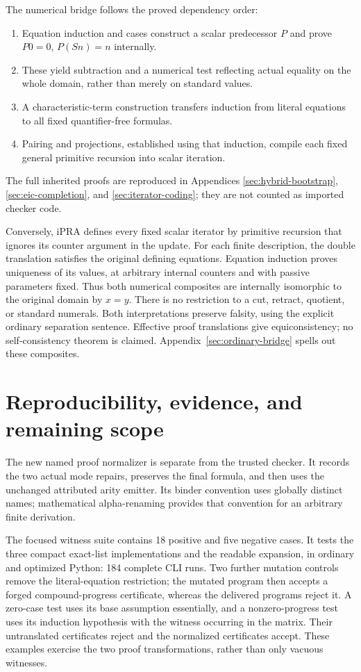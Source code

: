 \documentclass[11pt,letterpaper]{article}
\theoremstyle{definition}\newtheorem{definition}[theorem]{Definition}
\theoremstyle{remark}\newtheorem{remark}[theorem]{Remark}
\begin{document}
The numerical bridge follows the proved dependency order:
\begin{enumerate}
\item Equation induction and cases construct a scalar predecessor
      $P$ and prove $P0=0$, $P(Sn)=n$ internally.
\item These yield subtraction and a numerical test reflecting actual
      equality on the whole domain, rather than merely on standard values.
\item A characteristic-term construction transfers induction from
      literal equations to all fixed quantifier-free formulas.
\item Pairing and projections, established using that induction,
      compile each fixed general primitive recursion into scalar iteration.
\end{enumerate}
The full inherited proofs are reproduced in Appendices
\ref{sec:hybrid-bootstrap}, \ref{sec:eic-completion}, and
\ref{sec:iterator-coding}; they are not counted as imported checker code.

Conversely, iPRA defines every fixed scalar iterator by primitive recursion
that ignores its counter argument in the update. For each finite description,
the double translation satisfies the original defining equations.
Equation induction proves uniqueness of its values, at arbitrary internal
counters and with passive parameters fixed. Thus both numerical composites
are internally isomorphic to the original domain by $x=y$.
There is no restriction to a cut, retract, quotient, or standard numerals.
Both interpretations preserve falsity, using the explicit ordinary
separation sentence. Effective proof translations give equiconsistency;
no self-consistency theorem is claimed. Appendix~\ref{sec:ordinary-bridge}
spells out these composites.

\section{Reproducibility, evidence, and remaining scope}
\label{sec:evidence}

The new named proof normalizer is separate from the trusted checker.
It records the two actual mode repairs, preserves the final formula,
and then uses the unchanged attributed arity emitter. Its binder
convention uses globally distinct names; mathematical alpha-renaming
provides that convention for an arbitrary finite derivation.

The focused witness suite contains 18 positive and five negative cases.
It tests the three compact exact-list implementations and the readable
expansion, in ordinary and optimized Python: 184 complete CLI runs.
Two further mutation controls remove the literal-equation restriction;
the mutated program then accepts a forged compound-progress certificate,
whereas the delivered programs reject it. A zero-case test uses its base
assumption essentially, and a nonzero-progress test uses its induction
hypothesis with the witness occurring in the matrix. Their untranslated
certificates reject and the normalized certificates accept. These examples
exercise the two proof transformations, rather than only vacuous witnesses.
\end{document}
